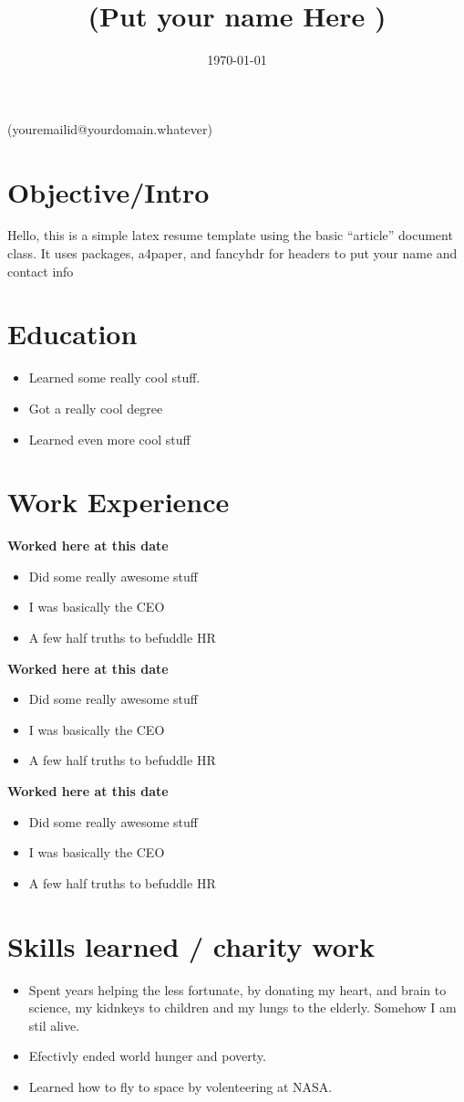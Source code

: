 \documentclass{article}
\title{  (Put your name Here ) }
\begin{document}
\date{\today}

\begin{center} (youremailid@yourdomain.whatever)         \end{center}

\section*{Objective/Intro}
 Hello, this is a simple latex resume template using the basic ``article'' document class.  It uses packages, a4paper, and fancyhdr for headers to put your name and contact info

\section*{Education}
\begin{itemize}
   \item Learned some really cool stuff.
   \item Got a really cool degree
   \item Learned even more cool stuff
\end{itemize}

\section*{Work Experience}
\textbf{Worked here at this date }
\begin{itemize}
   \item Did some really awesome stuff
   \item I was basically the CEO
   \item A few half truths to befuddle HR
\end{itemize}
\textbf{Worked here at this date}
\begin{itemize}
   \item Did some really awesome stuff
   \item I was basically the CEO
   \item A few half truths to befuddle HR
\end{itemize}
\textbf{Worked here at this date}
\begin{itemize}
   \item Did some really awesome stuff
   \item I was basically the CEO
   \item A few half truths to befuddle HR
\end{itemize}

\section*{Skills learned / charity work}
\begin{itemize}
    \item Spent years helping the less fortunate, by donating my heart, and brain to science, my kidnkeys to children and my lungs to the elderly. Somehow I am stil alive.
    \item Efectivly ended world hunger and poverty.
    \item Learned how to fly to space by volenteering at NASA.
\end{itemize}
  
\end{document}
